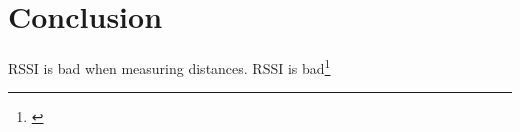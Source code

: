 \section{Conclusion}


RSSI is bad when measuring distances.
RSSI is bad\footnote{\cite{Heurtefeux2012}}